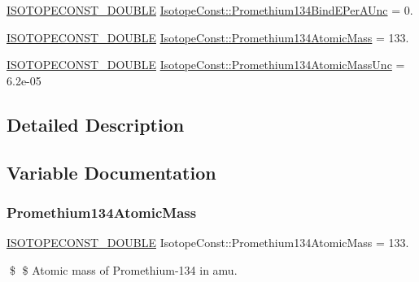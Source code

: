\begin{DoxyCompactItemize}
\item 
\mbox{\hyperlink{group___isotope_const-_macros_ga8f45a7272ce02c0b4c65c44636ed719a}{I\+S\+O\+T\+O\+P\+E\+C\+O\+N\+S\+T\+\_\+\+D\+O\+U\+B\+LE}} \mbox{\hyperlink{group___isotope_const-_promethium-_pm134_ga416d1239113e9f17899f2b8d39d1597d}{Isotope\+Const\+::\+Promethium134\+Bind\+E\+Per\+A\+Unc}} = 0.
\item 
\mbox{\hyperlink{group___isotope_const-_macros_ga8f45a7272ce02c0b4c65c44636ed719a}{I\+S\+O\+T\+O\+P\+E\+C\+O\+N\+S\+T\+\_\+\+D\+O\+U\+B\+LE}} \mbox{\hyperlink{group___isotope_const-_promethium-_pm134_gadeb2d097bd1598c1c2a178a272543d8c}{Isotope\+Const\+::\+Promethium134\+Atomic\+Mass}} = 133.
\item 
\mbox{\hyperlink{group___isotope_const-_macros_ga8f45a7272ce02c0b4c65c44636ed719a}{I\+S\+O\+T\+O\+P\+E\+C\+O\+N\+S\+T\+\_\+\+D\+O\+U\+B\+LE}} \mbox{\hyperlink{group___isotope_const-_promethium-_pm134_gaee6cb8c407f14aaa843ee6a49edca4bc}{Isotope\+Const\+::\+Promethium134\+Atomic\+Mass\+Unc}} = 6.\+2e-\/05
\end{DoxyCompactItemize}


\subsection{Detailed Description}


\subsection{Variable Documentation}
\mbox{\label{group___isotope_const-_promethium-_pm134_gadeb2d097bd1598c1c2a178a272543d8c}} 
\subsubsection{\texorpdfstring{Promethium134\+Atomic\+Mass}{Promethium134AtomicMass}}
{\footnotesize\ttfamily \mbox{\hyperlink{group___isotope_const-_macros_ga8f45a7272ce02c0b4c65c44636ed719a}{I\+S\+O\+T\+O\+P\+E\+C\+O\+N\+S\+T\+\_\+\+D\+O\+U\+B\+LE}} Isotope\+Const\+::\+Promethium134\+Atomic\+Mass = 133.}

\$ \$ Atomic mass of Promethium-\/134 in amu. \mbox{\label{group___isotope_const-_promethium-_pm134_gaee6cb8c407f14aaa843ee6a49edca4bc}} 
